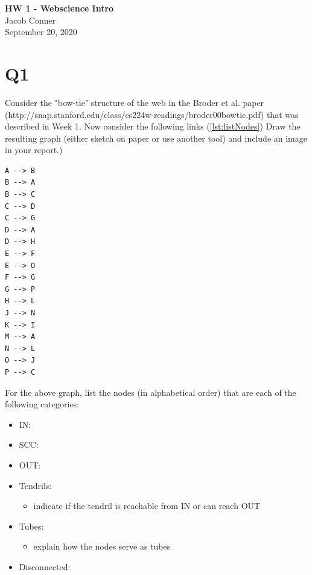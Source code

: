 \documentclass[12pt]{article}
\begin{document}
\begin{centering}
{\large\textbf{HW 1 - Webscience Intro}}\\ %
Jacob Conner\\                     %
September 20, 2020\\                      %
\end{centering}


\section*{Q1}
Consider the "bow-tie" structure of the web in the Broder et al. paper (http://snap.stanford.edu/class/cs224w-readings/broder00bowtie.pdf) that was described in Week 1.
Now consider the following links (\ref{lst:listNodes}) Draw the resulting graph (either sketch on paper or use another tool) and include an image in your report.)

\begin{lstlisting}[numbers=none, caption=Links, label=lst:listNodes]
A --> B
B --> A
B --> C
C --> D
C --> G
D --> A
D --> H
E --> F
E --> O
F --> G
G --> P
H --> L
J --> N
K --> I
M --> A
N --> L
O --> J
P --> C
\end{lstlisting}

For the above graph, list the nodes (in alphabetical order) that are each of the following categories:
\begin{itemize}
  \item IN:
  \item SCC:
  \item OUT:
  \item Tendrils:
	\begin{itemize}
		\item indicate if the tendril is reachable from IN or can reach OUT
	\end{itemize}
\item Tubes:
	\begin{itemize}
		\item explain how the nodes serve as tubes
	\end{itemize}
\item Disconnected:
\end{itemize}
\end{document}
